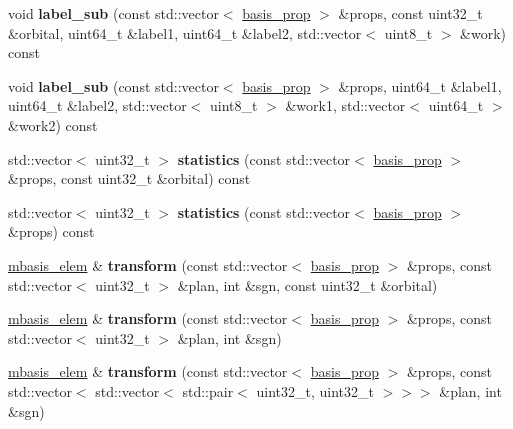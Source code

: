 \begin{DoxyCompactItemize}
void {\bfseries label\+\_\+sub} (const std\+::vector$<$ \hyperlink{classqbasis_1_1basis__prop}{basis\+\_\+prop} $>$ \&props, const uint32\+\_\+t \&orbital, uint64\+\_\+t \&label1, uint64\+\_\+t \&label2, std\+::vector$<$ uint8\+\_\+t $>$ \&work) const
\item 
\mbox{\label{classqbasis_1_1mbasis__elem_a4f10ee3d668b603b4aea1fd76b240d26}} 
void {\bfseries label\+\_\+sub} (const std\+::vector$<$ \hyperlink{classqbasis_1_1basis__prop}{basis\+\_\+prop} $>$ \&props, uint64\+\_\+t \&label1, uint64\+\_\+t \&label2, std\+::vector$<$ uint8\+\_\+t $>$ \&work1, std\+::vector$<$ uint64\+\_\+t $>$ \&work2) const
\item 
\mbox{\label{classqbasis_1_1mbasis__elem_a5a83b5c0f3faac2ca39740b5a70c4fc5}} 
std\+::vector$<$ uint32\+\_\+t $>$ {\bfseries statistics} (const std\+::vector$<$ \hyperlink{classqbasis_1_1basis__prop}{basis\+\_\+prop} $>$ \&props, const uint32\+\_\+t \&orbital) const
\item 
\mbox{\label{classqbasis_1_1mbasis__elem_a4de307a6a1c249ca36a431ea5cdfeb4b}} 
std\+::vector$<$ uint32\+\_\+t $>$ {\bfseries statistics} (const std\+::vector$<$ \hyperlink{classqbasis_1_1basis__prop}{basis\+\_\+prop} $>$ \&props) const
\item 
\mbox{\label{classqbasis_1_1mbasis__elem_acbe3b4d99c2c015e185193a8cfc0fcb1}} 
\hyperlink{classqbasis_1_1mbasis__elem}{mbasis\+\_\+elem} \& {\bfseries transform} (const std\+::vector$<$ \hyperlink{classqbasis_1_1basis__prop}{basis\+\_\+prop} $>$ \&props, const std\+::vector$<$ uint32\+\_\+t $>$ \&plan, int \&sgn, const uint32\+\_\+t \&orbital)
\item 
\mbox{\label{classqbasis_1_1mbasis__elem_a048a1f77f0cb869d5d8fab315f7a24c3}} 
\hyperlink{classqbasis_1_1mbasis__elem}{mbasis\+\_\+elem} \& {\bfseries transform} (const std\+::vector$<$ \hyperlink{classqbasis_1_1basis__prop}{basis\+\_\+prop} $>$ \&props, const std\+::vector$<$ uint32\+\_\+t $>$ \&plan, int \&sgn)
\item 
\mbox{\label{classqbasis_1_1mbasis__elem_aa7e0b736ce3790f322096f9080f8daa0}} 
\hyperlink{classqbasis_1_1mbasis__elem}{mbasis\+\_\+elem} \& {\bfseries transform} (const std\+::vector$<$ \hyperlink{classqbasis_1_1basis__prop}{basis\+\_\+prop} $>$ \&props, const std\+::vector$<$ std\+::vector$<$ std\+::pair$<$ uint32\+\_\+t, uint32\+\_\+t $>$$>$$>$ \&plan, int \&sgn)

\end{DoxyCompactItemize}
